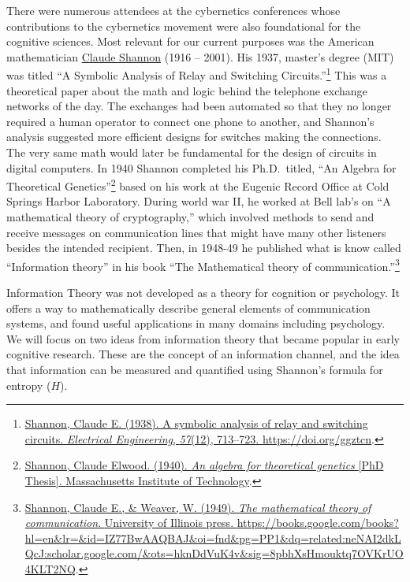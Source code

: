 \documentclass[
  oneside,
  12pt]{crumpbook}
\begin{document}
There were numerous attendees at the cybernetics conferences whose contributions to the cybernetics movement were also foundational for the cognitive sciences. Most relevant for our current purposes was the American mathematician \href{https://en.wikipedia.org/wiki/Claude_Shannon}{Claude Shannon} (1916 -- 2001). His 1937, master's degree (MIT) was titled ``A Symbolic Analysis of Relay and Switching Circuits.''\footnote{\protect\hyperlink{ref-shannonSymbolicAnalysisRelay1938}{Shannon, Claude E. (1938). A symbolic analysis of relay and switching circuits. \emph{Electrical Engineering}, \emph{57}(12), 713--723. \url{https://doi.org/ggztcn}}.} This was a theoretical paper about the math and logic behind the telephone exchange networks of the day. The exchanges had been automated so that they no longer required a human operator to connect one phone to another, and Shannon's analysis suggested more efficient designs for switches making the connections. The very same math would later be fundamental for the design of circuits in digital computers. In 1940 Shannon completed his Ph.D.~titled, ``An Algebra for Theoretical Genetics''\footnote{\protect\hyperlink{ref-shannonAlgebraTheoreticalGenetics1940}{Shannon, Claude Elwood. (1940). \emph{An algebra for theoretical genetics} {[}PhD Thesis{]}. {Massachusetts Institute of Technology}}.} based on his work at the Eugenic Record Office at Cold Springs Harbor Laboratory. During world war II, he worked at Bell lab's on ``A mathematical theory of cryptography,'' which involved methods to send and receive messages on communication lines that might have many other listeners besides the intended recipient. Then, in 1948-49 he published what is know called ``Information theory'' in his book ``The Mathematical theory of communication.''\footnote{\protect\hyperlink{ref-shannonMathematicalTheoryCommunication1949}{Shannon, Claude E., \& Weaver, W. (1949). \emph{The mathematical theory of communication}. {University of Illinois press}. \url{https://books.google.com/books?hl=en\&lr=\&id=IZ77BwAAQBAJ\&oi=fnd\&pg=PP1\&dq=related:neNAI2dkLQcJ:scholar.google.com/\&ots=hknDdVuK4v\&sig=8pbhXsHmouktq7OVKrUO4KLT2NQ}}.}

Information Theory was not developed as a theory for cognition or psychology. It offers a way to mathematically describe general elements of communication systems, and found useful applications in many domains including psychology. We will focus on two ideas from information theory that became popular in early cognitive research. These are the concept of an information channel, and the idea that information can be measured and quantified using Shannon's formula for entropy (\(H\)).
\end{document}
